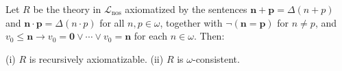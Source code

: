 Let $R$ be the theory in $\mathcal{L}_{\text{nos}}$ axiomatized by the sentences $\mathbf{n} + \mathbf{p} = \Delta(n + p)$ and $\mathbf{n} \cdot \mathbf{p} = \Delta(n \cdot p)$ for all $n, p \in \omega$, together with $\neg(\mathbf{n} = \mathbf{p})$ for $n \neq p$, and $v_0 \leq \mathbf{n} \rightarrow v_0 = \mathbf{0} \lor \cdots \lor v_0 = \mathbf{n}$ for each $n \in \omega$. Then:

(i) $R$ is recursively axiomatizable.
(ii) $R$ is $\omega$-consistent.
